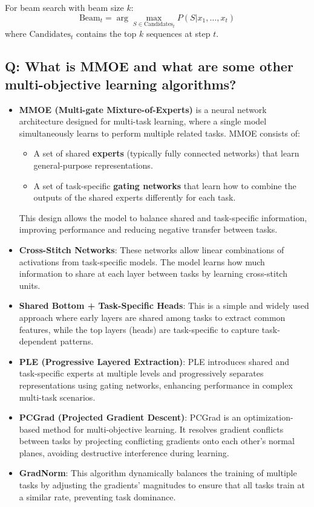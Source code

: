 For beam search with beam size \(k\):
\[
	\text{Beam}_t = \arg\max_{S \in \text{Candidates}_t} P(S | x_1, \ldots, x_t)
\]
where \(\text{Candidates}_t\) contains the top \(k\) sequences at step \(t\).

\subsection*{Q: What is MMOE and what are some other multi-objective learning algorithms?}
\begin{itemize}
	\item \textbf{MMOE (Multi-gate Mixture-of-Experts)} is a neural network architecture designed for multi-task learning, where a single model simultaneously learns to perform multiple related tasks. MMOE consists of:
	      \begin{itemize}
		      \item A set of shared \textbf{experts} (typically fully connected networks) that learn general-purpose representations.
		      \item A set of task-specific \textbf{gating networks} that learn how to combine the outputs of the shared experts differently for each task.
	      \end{itemize}
	      This design allows the model to balance shared and task-specific information, improving performance and reducing negative transfer between tasks.

	\item \textbf{Cross-Stitch Networks}: These networks allow linear combinations of activations from task-specific models. The model learns how much information to share at each layer between tasks by learning cross-stitch units.

	\item \textbf{Shared Bottom + Task-Specific Heads}: This is a simple and widely used approach where early layers are shared among tasks to extract common features, while the top layers (heads) are task-specific to capture task-dependent patterns.

	\item \textbf{PLE (Progressive Layered Extraction)}: PLE introduces shared and task-specific experts at multiple levels and progressively separates representations using gating networks, enhancing performance in complex multi-task scenarios.

	\item \textbf{PCGrad (Projected Gradient Descent)}: PCGrad is an optimization-based method for multi-objective learning. It resolves gradient conflicts between tasks by projecting conflicting gradients onto each other's normal planes, avoiding destructive interference during learning.

	\item \textbf{GradNorm}: This algorithm dynamically balances the training of multiple tasks by adjusting the gradients' magnitudes to ensure that all tasks train at a similar rate, preventing task dominance.

\end{itemize}

